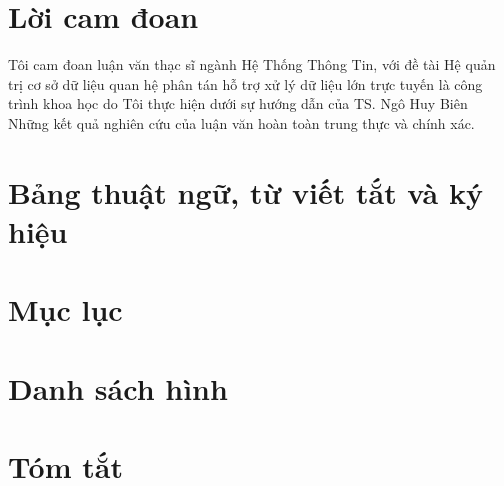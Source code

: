 \documentclass{article}[14pt]
\begin{document}
     \section{Lời cam đoan}
    {
Tôi cam đoan luận văn thạc sĩ ngành Hệ Thống Thông Tin, với đề tài Hệ quản trị cơ sở dữ liệu quan hệ phân tán hỗ trợ xử lý dữ liệu lớn trực tuyến là công trình khoa học do Tôi thực hiện dưới sự hướng dẫn của TS. Ngô Huy Biên Những kết quả nghiên cứu của luận văn hoàn toàn trung thực và chính xác.
    }

     \section{Bảng thuật ngữ, từ viết tắt và ký hiệu}
    {
    
    }

     \section{Mục lục}
    {
    
    }

    
     \section{Danh sách hình}
    {
    
    }

    \section{Tóm tắt}
    {
    
    }

    
    
\end{document}

